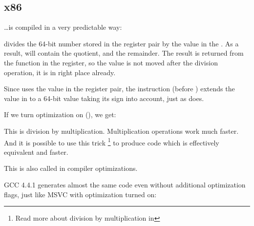 ﻿\subsection{x86}

\dots is compiled in a very predictable way:




\IDIV divides the 64-bit number stored in the  register pair by the value in the \ECX.
As a result, \EAX will contain the \gls{quotient}, and \EDX\EMDASH{}the remainder.
The result is returned from the \ttf function in the \EAX register, 
so the value is not moved after the division 
operation, it is in right place already.

Since \IDIV uses the value in the  register pair, the  instruction (before \IDIV) extends 
the value in \EAX to a 64-bit value taking its sign into account, just as \MOVSX does.

If we turn optimization on (\Ox), we get:



This is division by multiplication. Multiplication operations work much faster. 
And it is possible to use this trick
\footnote{Read more about division by multiplication in }
to produce code which is effectively equivalent and faster.

This is also called  in compiler optimizations.

GCC 4.4.1 generates almost the same code even without additional optimization flags, 
just like MSVC with optimization turned on:


